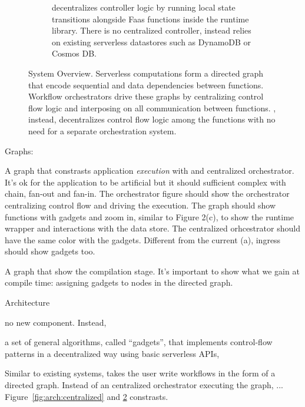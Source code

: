\begin{figure}[t]
\begin{subfigure}[b]{\columnwidth}
        \caption{\name{} decentralizes controller logic by running local state
                 transitions alongside Faas functions inside the \name{} runtime
                library. There is no centralized controller, instead \name{} relies on existing
                serverless datastores such as DynamoDB or Cosmos DB.}
        \label{fig:arch:unum}
    \end{subfigure}
    \caption{\name{} System Overview. Serverless computations form a directed
            graph that encode sequential and data dependencies between functions. Workflow
            orchestrators drive these graphs by centralizing control flow logic and
            interposing on all communication between functions. \name{},
            instead, decentralizes control flow logic among the functions with
            no need for a separate orchestration system.}
    \label{fig:arch}
\end{figure}




Graphs:

A graph that constrasts application \emph{execution} with \name{} and
centralized orchestrator. It's ok for the application to be artificial but it
should sufficient complex with chain, fan-out and fan-in. The orchestrator
figure should show the orchestrator centralizing control flow and driving the
execution. The \name{} graph should show functions with gadgets and zoom in,
similar to Figure 2(c), to show the runtime wrapper and interactions with the
data store. The centralized orhcestrator should have the same color with the
gadgets. Different from the current (a), ingress should show gadgets too.

A graph that show the compilation stage. It's important to show what we gain
at compile time: assigning gadgets to nodes in the directed graph.

Architecture%

no new component. Instead, 

a set of general algorithms, called ``gadgets'', that  implements control-flow
patterns in a decentralized way using basic serverless APIs, 

Similar to existing systems, \name{} takes the user write workflows in the
form of a directed graph. Instead of an centralized orchestrator executing the
graph, \name{} ... Figure~\ref{fig:arch:centralized} and \ref{fig:arch} constrasts.



